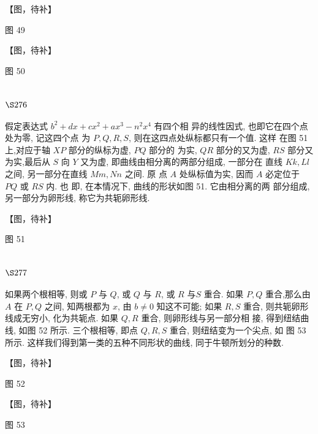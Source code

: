 【图，待补】

图 49


【图，待补】

图 50

\section{$\S 276$}

假定表达式 $b^{2}+d x+c x^{2}+a x^{3}-n^{2} x^{4}$ 有四个相 异的线性因式, 也即它在四个点处为零, 记这四个点 为 $P, Q, R, S$, 则在这四点处纵标都只有一个值. 这样 在图 51 上,对应于轴 $X P$ 部分的纵标为虚, $P Q$ 部分的 为实, $Q R$ 部分的又为虚, $R S$ 部分又为实,最后从 $S$ 向 $Y$ 又为虚, 即曲线由相分离的两部分组成, 一部分在 直线 $K k, L l$ 之间, 另一部分在直线 $M m, N n$ 之间. 原 点 $A$ 处纵标值为实, 因而 $A$ 必定位于 $P Q$ 或 $R S$ 内. 也 即, 在本情况下, 曲线的形状如图 51. 它由相分离的两 部分组成, 另一部分为卵形线, 称它为共轭卵形线.


【图，待补】

图 51

\section{$\S 277$}

如果两个根相等, 则或 $P$ 与 $Q$, 或 $Q$ 与 $R$, 或 $R$ 与$S$ 重合. 如果 $P, Q$ 重合,那么由 $A$ 在 $P, Q$ 之间, 知两根都为 $x$, 由 $b \neq 0$ 知这不可能; 如果 $R, S$ 重合, 则共轭卵形线成无穷小, 化为共轭点. 如果 $Q, R$ 重合, 则卵形线与另一部分相 接, 得到纽结曲线, 如图 52 所示. 三个根相等, 即点 $Q, R, S$ 重合, 则纽结变为一个尖点, 如 图 53 所示. 这样我们得到第一类的五种不同形状的曲线, 同于牛顿所划分的种数.


【图，待补】

图 52


【图，待补】

图 53

